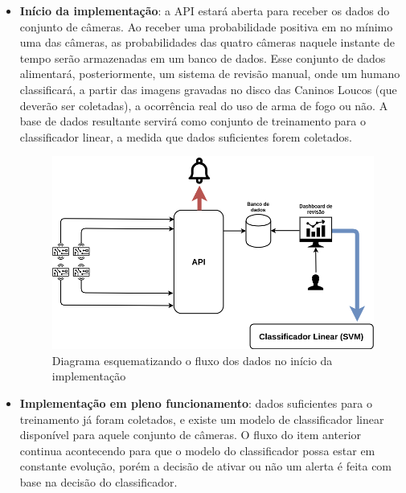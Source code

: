 \documentclass[]{politex}
\begin{document}
\begin{itemize}
  \item \textbf{Início da implementação}: a API estará aberta para receber os dados do conjunto de câmeras. Ao receber uma probabilidade positiva em no mínimo uma das câmeras, as probabilidades das quatro câmeras naquele instante de tempo serão armazenadas em um banco de dados. Esse conjunto de dados alimentará, posteriormente, um sistema de revisão manual, onde um humano classificará, a partir das imagens gravadas no disco das Caninos Loucos (que deverão ser coletadas), a ocorrência real do uso de arma de fogo ou não. A base de dados resultante servirá como conjunto de treinamento para o classificador linear, a medida que dados suficientes forem coletados.
  
  \begin{figure}[ht]
  \centering
  \includegraphics[scale=0.4]{img/fluxoinicial.png}
  \caption{Diagrama esquematizando o fluxo dos dados no início da implementação}
  \label{fig:fluxoinicial}
\end{figure}
  
  \item \textbf{Implementação em pleno funcionamento}: dados suficientes para o treinamento já foram coletados, e existe um modelo de classificador linear disponível para aquele conjunto de câmeras. O fluxo do item anterior continua acontecendo para que o modelo do classificador possa estar em constante evolução, porém a decisão de ativar ou não um alerta é feita com base na decisão do classificador.
  

\end{itemize}
\end{document}
